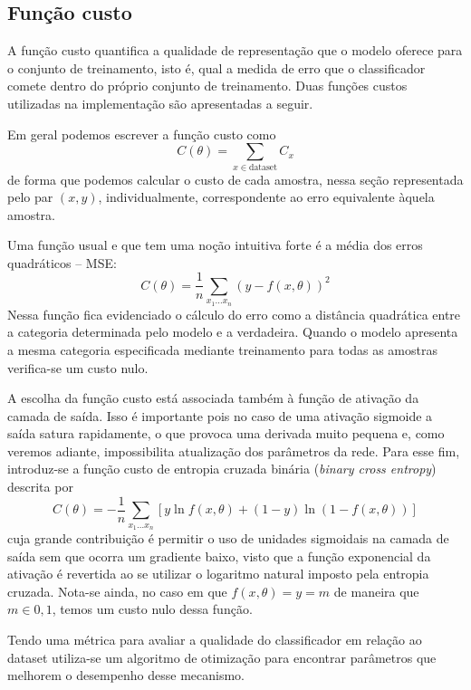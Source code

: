 \subsection{Função custo}
A função custo quantifica a qualidade de representação que o modelo oferece para o conjunto de treinamento, isto é, qual a medida de erro que o classificador comete dentro do próprio conjunto de treinamento. Duas funções custos utilizadas na implementação são apresentadas a seguir.

Em geral podemos escrever a função custo como
\begin{equation}
C(\theta) = \sum_{x \in \text{dataset}} C_x
\end{equation}
de forma que podemos calcular o custo de cada amostra, nessa seção representada pelo par $(x,y)$, individualmente, correspondente ao erro equivalente àquela amostra.

Uma função usual e que tem uma noção intuitiva forte é a média dos erros quadráticos -- MSE:
\begin{equation}
\label{eq:mse}
C(\theta) = \frac{1}{n} \sum_{x_1 \ldots x_n} \left(y - f(x,\theta)\right)^2
\end{equation}
Nessa função fica evidenciado o cálculo do erro como a distância quadrática entre a categoria determinada pelo modelo e a verdadeira. Quando o modelo apresenta a mesma categoria especificada mediante treinamento para todas as amostras verifica-se um custo nulo.

A escolha da função custo está associada também à função de ativação da camada de saída. Isso é importante pois no caso de uma ativação sigmoide a saída satura rapidamente, o que provoca uma derivada muito pequena e, como veremos adiante, impossibilita atualização dos parâmetros da rede. Para esse fim, introduz-se a função custo de entropia cruzada binária (\textit{binary cross entropy}) descrita por
\begin{equation}
\label{eq:bcr}
C(\theta) = -\frac{1}{n} \sum_{x_1 \ldots x_n} \left[y \ln f(x,\theta) + (1-y) \ln (1-f(x,\theta))\right]
\end{equation}
cuja grande contribuição é permitir o uso de unidades sigmoidais na camada de saída sem que ocorra um gradiente baixo, visto que a função exponencial da ativação é revertida ao se utilizar o logaritmo natural imposto pela entropia cruzada. Nota-se ainda, no caso em que $f(x,\theta)=y=m$ de maneira que $m \in {0,1}$, temos um custo nulo dessa função.

Tendo uma métrica para avaliar a qualidade do classificador em relação ao dataset utiliza-se um algoritmo de otimização para encontrar parâmetros que melhorem o desempenho desse mecanismo.

